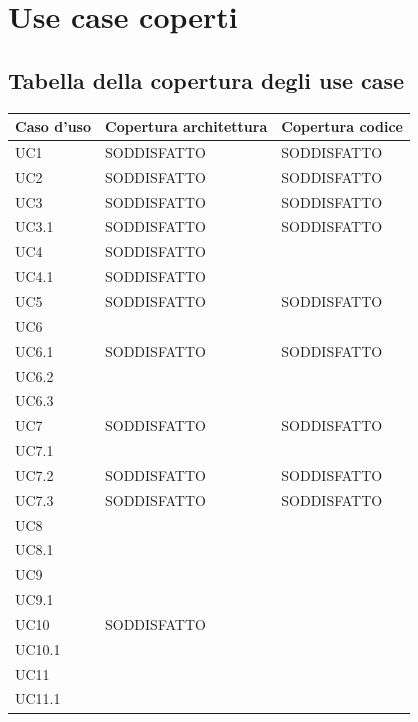 \documentclass[openany,12pt,a4paper]{report}
\begin{document}
	\chapter{Use case coperti}
	
	\section{Tabella della copertura degli use case}
	
	\begin{longtable}{|p{40mm}|p{40mm}|p{40mm}|}
		\hline
		\centering \textbf{Caso d'uso} & \textbf{Copertura architettura} &  \textbf{Copertura codice}\\
		
		\hline \centering UC1 & SODDISFATTO & SODDISFATTO \\
		\hline \centering UC2 & SODDISFATTO & SODDISFATTO\\
		\hline \centering UC3 & SODDISFATTO & SODDISFATTO\\
		\hline \centering UC3.1 & SODDISFATTO & SODDISFATTO\\
		\hline \centering UC4 & SODDISFATTO & \\
		\hline \centering UC4.1 & SODDISFATTO & \\
		\hline \centering UC5 & SODDISFATTO & SODDISFATTO\\
		\hline \centering UC6 &  &\\
		\hline \centering UC6.1 & SODDISFATTO & SODDISFATTO\\
		\hline \centering UC6.2 &  &\\
		\hline \centering UC6.3 &  &\\
		\hline \centering UC7 & SODDISFATTO & SODDISFATTO\\
		\hline \centering UC7.1 &  & \\
		\hline \centering UC7.2 & SODDISFATTO & SODDISFATTO\\
		\hline \centering UC7.3 & SODDISFATTO & SODDISFATTO\\
		\hline \centering UC8 &  & \\
		\hline \centering UC8.1 &  & \\
		\hline \centering UC9 &  & \\
		\hline \centering UC9.1 &  & \\
		\hline \centering UC10 & SODDISFATTO & \\
		\hline \centering UC10.1 &  & \\
		\hline \centering UC11 &  & \\
		\hline \centering UC11.1 &  & \\

\end{longtable}
\end{document}
